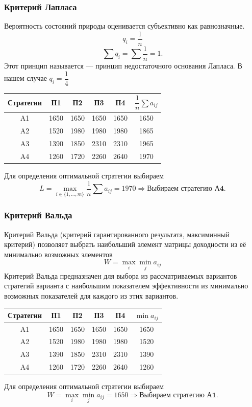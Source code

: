 \documentclass[11pt]{article}
\begin{document}
\subsubsection*{Критерий Лапласа}
Вероятность состояний природы оценивается субъективно
как равнозначные.
$$q_i =\dfrac{1}{n}$$
$$\sum q_i =
\sum \dfrac{1}{n}= 1.$$
Этот принцип называется — принцип недостаточного основания Лапласа.
В нашем случае $q_i = \dfrac{1}{4}$
\begin{table}[h]
    \centering
    \begin{tabular}{|c|c|c|c|c|c|}
        \hline
         Стратегии & П1 & П2 & П3 & П4 & $\dfrac{1}{n} \sum a_{ij}$\\
         \hline
         A1 & 1650 & 1650 & 1650 & 1650 & 1650 \\
         \hline
         A2 & 1520 & 1980 & 1980 & 1980 & 1865 \\
         \hline
         A3 & 1390 & 1850 & 2310 & 2310 & 1965\\
         \hline 
         A4 & 1260 & 1720 & 2260 & 2640 & 1970\\
         \hline
    \end{tabular}
\end{table}

Для определения оптимальной стратегии выбираем $$L = \max_{i \in \{1, ..., m\}} \dfrac{1}{n} \sum a_{ij} = 1970 \Rightarrow \textbf{Выбираем стратегию А4}.$$

\subsubsection*{Критерий Вальда}
Критерий Вальда (критерий гарантированного результата,
максиминный критерий) позволяет выбрать наибольший
элемент матрицы доходности из её минимально возможных
элементов
$$W = \max_i \min_j a_{ij}$$
Критерий Вальда предназначен для выбора из
рассматриваемых вариантов стратегий варианта с
наибольшим показателем эффективности из минимально
возможных показателей для каждого из этих вариантов.
\begin{table}[h]
    \centering
    \begin{tabular}{|c|c|c|c|c|c|}
        \hline
         Стратегии & П1 & П2 & П3 & П4 & $\min a_{ij}$\\
         \hline
         A1 & 1650 & 1650 & 1650 & 1650 & 1650 \\
         \hline
         A2 & 1520 & 1980 & 1980 & 1980 & 1520 \\
         \hline
         A3 & 1390 & 1850 & 2310 & 2310 & 1390\\
         \hline 
         A4 & 1260 & 1720 & 2260 & 2640 & 1260\\
         \hline
    \end{tabular}
\end{table}
Для определения оптимальной стратегии выбираем $$W = \max_i\min_j a_{ij} = 1650 \Rightarrow \textbf{Выбираем стратегию А1}.$$
\end{document}
